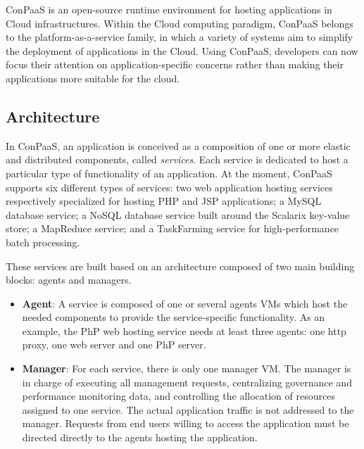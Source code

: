 

ConPaaS is an open-source runtime environment for hosting applications in Cloud infrastructures.
Within the Cloud computing paradigm, ConPaaS belongs to the platform-as-a-service family, 
in which a variety of systems aim to simplify the deployment of applications in the Cloud. Using ConPaaS,  developers can now focus their attention on application-specific concerns rather than making their applications more suitable for the cloud. 

\subsection{Architecture}

In ConPaaS, an application is conceived as a composition of one or more elastic and distributed components, called \emph{services}. Each service is dedicated to host a particular type of functionality of an application. At the moment, ConPaaS supports six different types of services: two web application hosting services respectively specialized for hosting PHP and JSP applications; a MySQL database service; a NoSQL database service built around the Scalarix key-value store; a MapReduce service; and a TaskFarming service for high-performance batch processing.  

These services are built based on an architecture composed of two main building blocks: agents and managers.


\begin{itemize}
\item \textbf{Agent}: A service is composed of one or several agents VMs which host the needed components to provide the service-specific functionality. As an example, the PhP web hosting service needs at least three agents: one http proxy, one web server and one PhP server.  

\item \textbf{Manager}: For each service, there is only one manager VM. The manager is in charge of executing all management requests, centralizing governance and performance monitoring data, and controlling the allocation of resources assigned to one service. The actual application traffic is not addressed to the manager. Requests from end users willing to access the application must be directed directly to the agents hosting the application.

\end{itemize}

